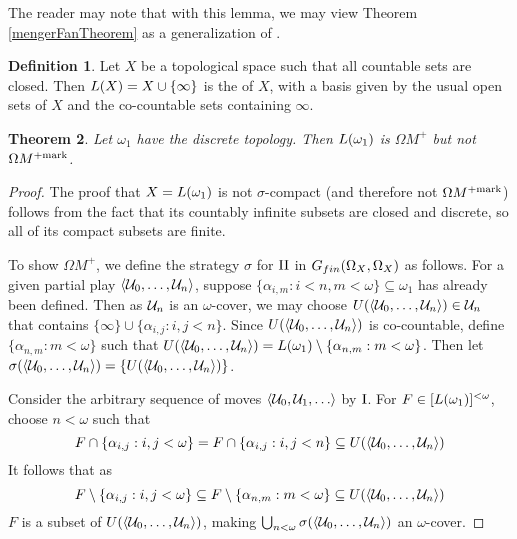 \documentclass{amsart}
\theoremstyle{plain}
\newtheorem{theorem}{Theorem}
\theoremstyle{definition}
\newtheorem{definition}[theorem]{Definition}
\theoremstyle{remark}
\theoremstyle{plain}
\theoremstyle{definition}
\theoremstyle{remark}
\begin{document}
The reader may note that with this lemma, we may view Theorem
\ref{mengerFanTheorem} as a generalization of
\cite[Proposition 2.6]{MR2868880}.

\begin{definition}
  Let \(X\) be a topological space such that all countable sets are
  closed. Then \(L(X)=X\cup\{\infty\}\)
  is the  of \(X\), with a basis given
  by the usual open sets of \(X\) and the co-countable sets containing
  \(\infty\).
\end{definition}

\begin{theorem}\label{omega1OmegaMenger}
  Let \(\omega_1\) have the discrete topology. Then
  \(L(\omega_1)\) is \(\Omega M^+\) but not \(\Omega M^{+\mathrm{mark}}\).
\end{theorem}

\begin{proof}
  The proof that \(X=L(\omega_1)\) is not
  \(\sigma\)-compact (and therefore not \(\Omega M^{+\mathrm{mark}}\))
  follows from the fact that its countably infinite subsets
  are closed and discrete, so all of its compact subsets are finite.

  To show \(\Omega M^+\),
  we define the strategy \(\sigma\) for \(\mathrm{II}\) in
  \(G_{fin}(\Omega_X,\Omega_X)\) as follows.
  For a given partial play \(\langle\mathcal{U}_0,\dots,\mathcal{U}_n\rangle\), suppose
  \(\{\alpha_{i,m}:i<n,m<\omega\}\subseteq\omega_1\) has already been defined.
  Then as \(\mathcal{U}_n\) is an \(\omega\)-cover, we may
  choose \(U(\langle\mathcal{U}_0,\dots,\mathcal{U}_n\rangle)\in\mathcal{U}_n\) that contains
  \(\{\infty\}\cup\{\alpha_{i,j}:i,j<n\}\). Since
  \(U(\langle\mathcal{U}_0,\dots,\mathcal{U}_n\rangle)\) is co-countable, define
  \(\{\alpha_{n,m}:m<\omega\}\) such that
  \(
    U(\langle\mathcal{U}_0,\dots,\mathcal{U}_n\rangle)
      =
    L(\omega_1)
      \setminus
    \{\alpha_{n,m}:m<\omega\}
  \). Then let
  \(\sigma(\langle\mathcal{U}_0,\dots,\mathcal{U}_n\rangle)=\{U(\langle\mathcal{U}_0,\dots,\mathcal{U}_n\rangle)\}\).

  Consider the arbitrary sequence of moves \(\<\mc U_0,\mc U_1,\dots\>\)
  by \(\mathrm{I}\). For \(F\in[L(\omega_1)]^{<\omega}\), choose
  \(n<\omega\) such that
  \[
    F\cap\{\alpha_{i,j}:i,j<\omega\}
      =
    F\cap\{\alpha_{i,j}:i,j<n\}
      \subseteq
    U(\langle\mathcal{U}_0,\dots,\mathcal{U}_n\rangle)
  \]
  It follows that as
  \[
    F
      \setminus
    \{\alpha_{i,j}:i,j<\omega\}
      \subseteq
    F
      \setminus
    \{\alpha_{n,m}:m<\omega\}
      \subseteq
    U(\langle\mathcal{U}_0,\dots,\mathcal{U}_n\rangle)
  \]
  \(F\) is a subset of
  \(U(\langle\mathcal{U}_0,\dots,\mathcal{U}_n\rangle)\), making
  \(
    \bigcup_{n<\omega}
    \sigma(\langle\mathcal{U}_0,\dots,\mathcal{U}_n\rangle)
  \)
  an \(\omega\)-cover.
\end{proof}
\end{document}
